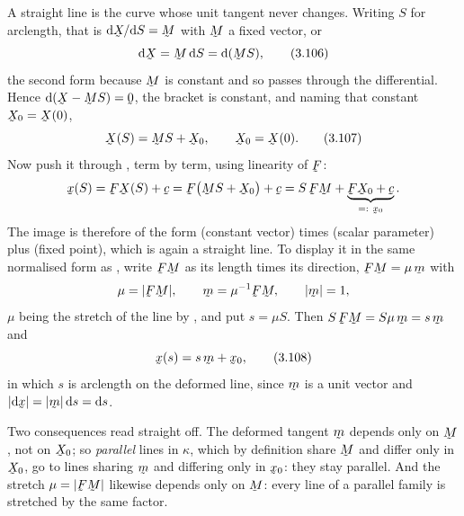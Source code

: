 A straight line is the curve whose unit tangent never changes. Writing $S$
for arclength, that is $\dl\bX/\dl S=\bM$ with $\bM$ a fixed vector, or
\begin{equation}
   \dl\bX=\bM\,\dl S=\dl(\bM S),
   \tag{3.106}\label{eq:3.106}
\end{equation}
the second form because $\bM$ is constant and so passes through the
differential. Hence $\dl(\bX-\bM S)=\bze$, the bracket is constant, and
naming that constant $\bX_{0}=\bX(0)$,
\begin{equation}
   \bX(S)=\bM S+\bX_{0},\qquad \bX_{0}=\bX(0).
   \tag{3.107}\label{eq:3.107}
\end{equation}
Now push it through , term by term, using linearity of $\bF$:
\[
   \bx(S)=\bF\bX(S)+\bc=\bF\big(\bM S+\bX_{0}\big)+\bc
        =S\,\bF\bM+\underbrace{\bF\bX_{0}+\bc}_{=:\ \bx_{0}} .
\]
The image is therefore of the form (constant vector) times (scalar
parameter) plus (fixed point), which is again a straight line. To display
it in the same normalised form as , write $\bF\bM$ as its length
times its direction, $\bF\bM=\mu\,\bm$ with
\[
   \mu=|\bF\bM|,\qquad \bm=\mu^{-1}\bF\bM,\qquad |\bm|=1 ,
\]
$\mu$ being the stretch of the line by , and put $s=\mu S$. Then
$S\,\bF\bM=S\mu\,\bm=s\,\bm$ and
\begin{equation}
   \bx(s)=s\,\bm+\bx_{0},
   \tag{3.108}\label{eq:3.108}
\end{equation}
in which $s$ is arclength on the deformed line, since $\bm$ is a unit
vector and $|\dl\bx|=|\bm|\,\dl s=\dl s$.

Two consequences read straight off. The deformed tangent $\bm$ depends only
on $\bM$, not on $\bX_{0}$; so \emph{parallel} lines in $\kappa$, which by
definition share $\bM$ and differ only in $\bX_{0}$, go to lines sharing
$\bm$ and differing only in $\bx_{0}$: they stay parallel. And the stretch
$\mu=|\bF\bM|$ likewise depends only on $\bM$: every line of a parallel
family is stretched by the same factor.

